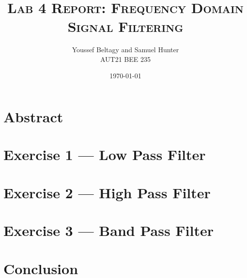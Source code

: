 \documentclass[11pt]{article}
\title{
    \textsc{Lab 4 Report: Frequency Domain Signal Filtering}
}
\author{
    \Large{Youssef Beltagy and Samuel Hunter} \\
    \large \textsc{AUT21 BEE 235}
}
\date{\today}
\begin{document}
\maketitle %
\pagebreak


\section{Abstract}

\section{Exercise 1 --- Low Pass Filter}



\section{Exercise 2 --- High Pass Filter}



\section{Exercise 3 --- Band Pass Filter}



\section{Conclusion}
\end{document}
